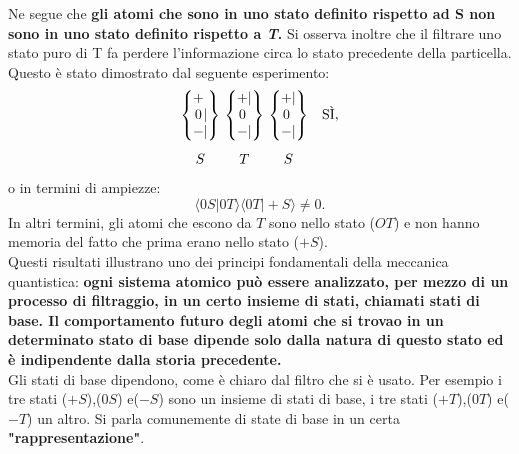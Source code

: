 \documentclass[a4paper,12pt,oneside]{book}
\begin{document}
Ne segue che \textbf{gli atomi che sono in uno stato definito rispetto ad S non sono in uno stato definito rispetto a \emph{T}.}
Si osserva inoltre che il filtrare uno stato puro di T fa perdere l'informazione circa lo stato precedente della particella. Questo è stato dimostrato dal seguente esperimento:
	\begin{equation}
		\begin{matrix}
		\begin{Bmatrix}
			\makebox[\widthof{$-$}]{$+$}\makebox[\widthof{$|$}]{$\ $} \\ \makebox[\widthof{$-$}]{$0$}|\\ - | 
		\end{Bmatrix} \\[0.7cm]
			S
		\end{matrix} \
		\begin{matrix}
		\begin{Bmatrix}
 			\makebox[\widthof{$-$}]{$+$} | \\ \makebox[\widthof{$-$}]{$0$}\makebox[\widthof{$|$}]{$\ $} \\ - | 
		\end{Bmatrix}  \\[0.7cm]
			T
		\end{matrix}\
		\begin{matrix}
		\begin{Bmatrix}
 			\makebox[\widthof{$-$}]{$+$} | \\ \makebox[\widthof{$-$}]{$0$}\makebox[\widthof{$|$}]{$\ $}\\ - | 
		\end{Bmatrix} &\textrm{SÌ,} \\[0.7cm]
			S &
		\end{matrix}
	\label{SG8}
	\end{equation}
o in termini di ampiezze:
	\begin{equation}
		\langle 0S | 0T \rangle \langle 0T | +S \rangle \neq 0 .
	\end{equation}
In altri termini, gli atomi che escono da $T$ sono nello stato ($OT$) e non hanno memoria del fatto che prima erano nello stato ($+S$).\\

Questi risultati illustrano uno dei principi fondamentali della meccanica quantistica: \textbf{ogni sistema atomico può essere analizzato, per mezzo di un processo di filtraggio, in un certo insieme di stati, chiamati stati di base. Il comportamento futuro degli atomi che si trovao in un determinato stato di base dipende solo dalla natura di questo stato ed è indipendente dalla storia precedente.}\\
Gli stati di base dipendono, come è chiaro dal filtro che si è usato. Per esempio i tre stati ($+S$),($0S$) e($-S$) sono un insieme di stati di base, i tre stati ($+T$),($0T$) e($-T$) un altro. Si parla comunemente di state di base in un certa \textbf{"rappresentazione"}.\\
\end{document}
